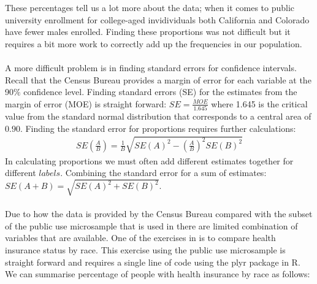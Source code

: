 \documentclass{article}\usepackage[]{graphicx}\usepackage[]{color}
\begin{document}
These percentages tell us a lot more about the data; when it comes to public university enrollment for college-aged invidividuals both California and Colorado have fewer males enrolled.  Finding these proportions was not difficult but it requires a bit more work to correctly add up the frequencies in our population.\\
\\
A more difficult problem is in finding standard errors for confidence intervals.  Recall that the Census Bureau provides a margin of error for each variable at the 90$\%$ confidence level.  Finding standard errors (SE) for the estimates from the margin of error (MOE) is straight forward: $SE = \frac{MOE}{1.645}$ where 1.645 is the critical value from the standard normal distribution that corresponds to a central area of $0.90$.  Finding the standard error for proportions requires further calculations:
\begin{align*}
SE(\frac{A}{B}) = \frac{1}{B}\sqrt{SE(A)^2 - (\frac{A}{B})^2 SE(B)^2}
\end{align*}
In calculating proportions we must often add different estimates together for different $labels$.  Combining the standard error for a sum of estimates: $SE(A + B) = \sqrt{SE(A)^2 + SE(B)^2}$.\\
\\
Due to how the data is provided by the Census Bureau compared with the subset of the public use microsample that is used in \citet{stangl:2013} there are limited combination of variables that are available.  One of the exercises in \citet{stangl:2013} is to compare health insurance status by race.  This exercise using the public use microsample is straight forward and requires a single line of code using the plyr package in R.  We can summarise percentage of people with health insurance by race as follows:
\end{document}
